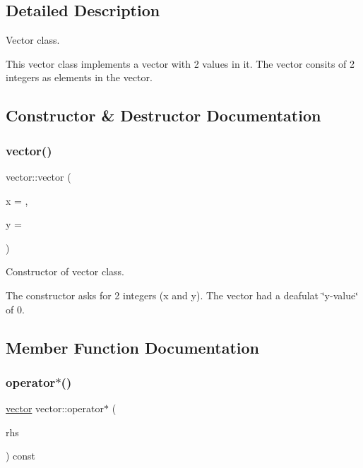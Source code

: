 \subsection{Detailed Description}
Vector class. 

This vector class implements a vector with 2 values in it. The vector consits of 2 integers as elements in the vector. 

\subsection{Constructor \& Destructor Documentation}
\mbox{\label{classvector_ada69c108ec9393e6f70bdfcd58366cbf}} 
\subsubsection{\texorpdfstring{vector()}{vector()}}
{\footnotesize\ttfamily vector\+::vector (\begin{DoxyParamCaption}\item[{int}]{x = {},  }\item[{int}]{y = {} }\end{DoxyParamCaption})\hspace{0.3cm}{\ttfamily [inline]}}



Constructor of vector class. 

The constructor asks for 2 integers (x and y). The vector had a deafulat \char`\"{}y-\/value\char`\"{} of 0. 

\subsection{Member Function Documentation}
\mbox{\label{classvector_ad3885453eb4f2938c532a19729d39b66}} 
\subsubsection{\texorpdfstring{operator$\ast$()}{operator*()}}
{\footnotesize\ttfamily \hyperlink{classvector}{vector} vector\+::operator$\ast$ (\begin{DoxyParamCaption}\item[{const int \&}]{rhs }\end{DoxyParamCaption}) const}



